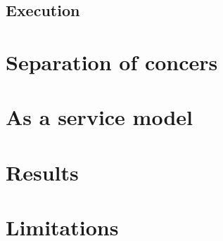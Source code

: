 \subsection{Execution}\label{sec:execution}
%
%


\section{Separation of concers}\label{sec:separation_of_concerns}
%
%



\section{As a service model}\label{sec:as_a_service_model}
%
%



\section{Results}\label{sec:results}
%
%



\section{Limitations}\label{sec:limitations}
%
%
